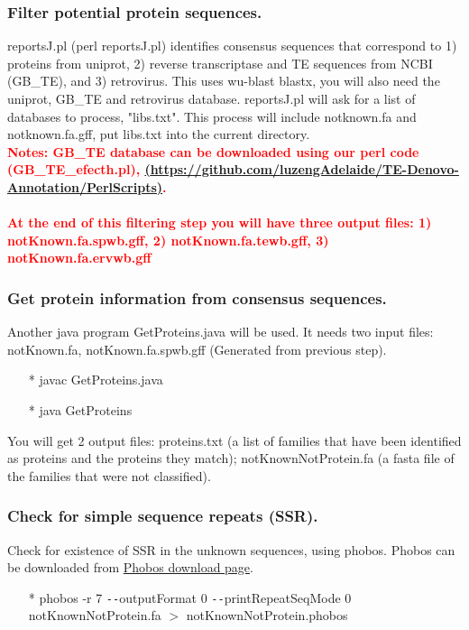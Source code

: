 \documentclass[12pt]{report}
\begin{document}
\subsubsection*{Filter potential protein sequences.}
reportsJ.pl (perl reportsJ.pl) identifies consensus sequences that correspond to 1) proteins from uniprot, 2) reverse transcriptase and TE sequences from NCBI (GB\_TE), and 3) retrovirus. This uses wu-blast blastx, you will also need the uniprot, GB\_TE and retrovirus database. reportsJ.pl will ask for a list of databases to process, "libs.txt". This process will include notknown.fa and notknown.fa.gff, put libs.txt into the current directory. \\

\noindent\textbf{\textcolor{red}{Notes: GB\_TE database can be downloaded using our perl code (GB\_TE\_efecth.pl), \href{<url>}(\url{https://github.com/luzengAdelaide/TE-Denovo-Annotation/PerlScripts)}. \\
		\\
At the end of this filtering step you will have three output files: 1) notKnown.fa.spwb.gff, 2) notKnown.fa.tewb.gff, 3) notKnown.fa.ervwb.gff}} 

\subsubsection*{Get protein information from consensus sequences.}
Another java program GetProteins.java will be used. It needs two input files: notKnown.fa, notKnown.fa.spwb.gff (Generated from previous step).
\begin{enumerate}
	\item[*] javac GetProteins.java
	\item[*] java GetProteins
\end{enumerate}
You will get 2 output files: proteins.txt (a list of families that have been identified as proteins and the proteins they match);
notKnownNotProtein.fa (a fasta file of the families that were not classified).

\subsubsection*{Check for simple sequence repeats (SSR).}
Check for existence of SSR in the unknown sequences, using phobos. Phobos can be downloaded from \href{http://www.ruhr-uni-bochum.de/ecoevo/cm/cm_phobos.htm} {\color{blue} Phobos download page}.
\begin{enumerate}
	\item[*] phobos -r 7 \texttt{-{}-}outputFormat 0 \texttt{-{}-}printRepeatSeqMode 0 notKnownNotProtein.fa $>$ notKnownNotProtein.phobos
\end{enumerate}
\end{document}
